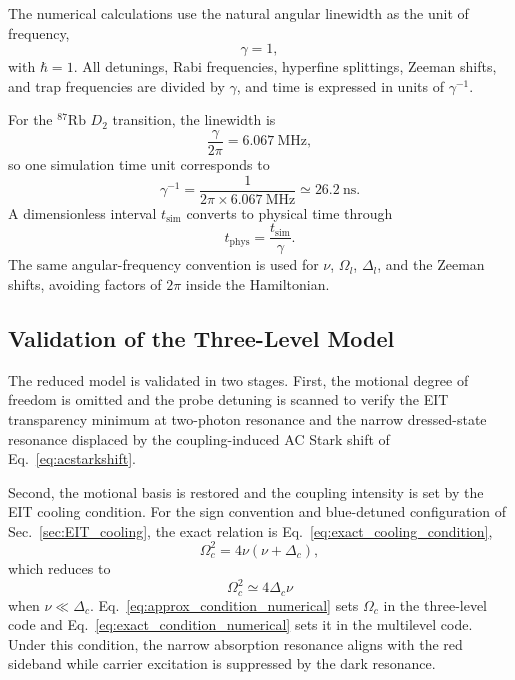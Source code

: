 The numerical calculations use the natural angular linewidth as the unit of frequency,
\begin{equation}
    \gamma=1,
\end{equation}
with $\hbar=1$. All detunings, Rabi frequencies, hyperfine splittings, Zeeman shifts, and trap frequencies are divided by $\gamma$, and time is expressed in units of $\gamma^{-1}$.

For the $^{87}\mathrm{Rb}$ $D_2$ transition, the linewidth is
\begin{equation}
    \frac{\gamma}{2\pi}=6.067~\mathrm{MHz},
\end{equation}
so one simulation time unit corresponds to
\begin{equation}
    \gamma^{-1}
    =
    \frac{1}{2\pi\times6.067~\mathrm{MHz}}
    \simeq
    26.2~\mathrm{ns}.
    \label{eq:time_conversion}
\end{equation}
A dimensionless interval $t_{\mathrm{sim}}$ converts to physical time through
\begin{equation}
    t_{\mathrm{phys}}
    =
    \frac{t_{\mathrm{sim}}}{\gamma}.
    \label{eq:physical_time_conversion}
\end{equation}
The same angular-frequency convention is used for $\nu$, $\Omega_l$, $\Delta_l$, and the Zeeman shifts, avoiding factors of $2\pi$ inside the Hamiltonian.

\subsection{Validation of the Three-Level Model}
\label{subsec:three_level_validation}

The reduced model is validated in two stages. First, the motional degree of freedom is omitted and the probe detuning is scanned to verify the EIT transparency minimum at two-photon resonance and the narrow dressed-state resonance displaced by the coupling-induced AC Stark shift of Eq.~\eqref{eq:acstarkshift}.

Second, the motional basis is restored and the coupling intensity is set by the EIT cooling condition. For the sign convention and blue-detuned configuration of Sec.~\ref{sec:EIT_cooling}, the exact relation is Eq.~\eqref{eq:exact_cooling_condition},
\begin{equation}
    \Omega_c^2=4\nu(\nu+\Delta_c),
    \label{eq:exact_condition_numerical}
\end{equation}
which reduces to
\begin{equation}
    \Omega_c^2\simeq4\Delta_c\nu
    \label{eq:approx_condition_numerical}
\end{equation}
when $\nu\ll\Delta_c$. Eq.~\eqref{eq:approx_condition_numerical} sets $\Omega_c$ in the three-level code and Eq.~\eqref{eq:exact_condition_numerical} sets it in the multilevel code. Under this condition, the narrow absorption resonance aligns with the red sideband while carrier excitation is suppressed by the dark resonance.

